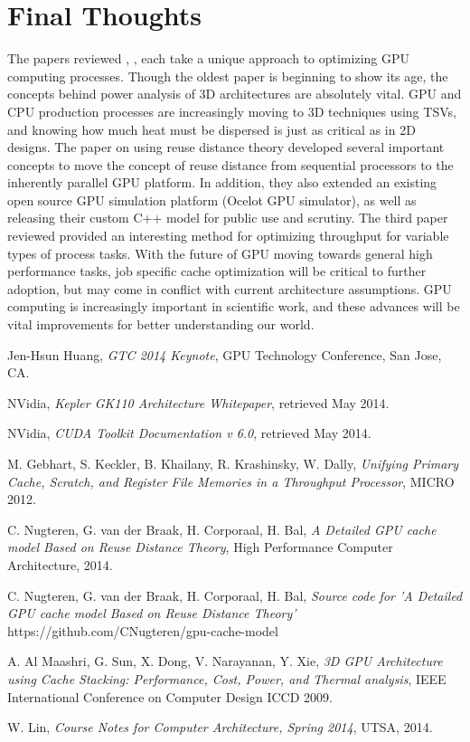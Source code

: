 \documentclass[conference]{IEEEtran}
\begin{document}
\section{Final Thoughts}
The papers reviewed \cite{throughput}, \cite{cache}, \cite{cachestacking} each
take a unique approach to optimizing GPU computing processes. Though the oldest
paper \cite{cachestacking} is beginning to show its age, the concepts behind 
power analysis of 3D architectures are absolutely vital. GPU and CPU production
processes are increasingly moving to 3D techniques using TSVs, and knowing how
much heat must be dispersed is just as critical as in 2D designs. The paper on
using reuse distance theory \cite{cache} developed several important concepts
to move the concept of reuse distance from sequential processors to the 
inherently parallel GPU platform. In addition, they also extended an existing 
open source GPU simulation platform (Ocelot GPU simulator), as well as 
releasing their custom C++ model for public use and scrutiny. The third paper 
reviewed \cite{throughput} provided an interesting method for optimizing 
throughput for variable types of process tasks. With the future of GPU 
moving towards general high performance tasks, job specific cache optimization 
will be critical to further adoption, but may come in conflict with current
architecture assumptions. GPU computing is increasingly important in scientific
work, and these advances will be vital improvements for better understanding
our world.

\begin{thebibliography}{1}
Jen-Hsun Huang, \emph{GTC 2014 Keynote}, GPU Technology Conference, San Jose, CA.

NVidia, \emph{Kepler GK110 Architecture Whitepaper}, retrieved May 2014.

NVidia, \emph{CUDA Toolkit Documentation v 6.0}, retrieved May 2014.

M. Gebhart, S. Keckler, B. Khailany, R. Krashinsky, W. Dally, 
\emph{Unifying Primary Cache, Scratch, and Register File Memories in a 
Throughput Processor}, MICRO 2012.

C. Nugteren, G. van der Braak, H. Corporaal, H. Bal, 
\emph{A Detailed GPU cache model Based on Reuse Distance Theory}, 
High Performance Computer Architecture, 2014.

C. Nugteren, G. van der Braak, H. Corporaal, H. Bal, 
\emph{Source code for 'A Detailed GPU cache model Based on Reuse Distance Theory'}
 https://github.com/CNugteren/gpu-cache-model

A. Al Maashri, G. Sun, X. Dong, V. Narayanan, Y. Xie,
\emph{3D GPU Architecture using Cache Stacking: Performance, Cost, Power, and
Thermal analysis}, IEEE International Conference on Computer Design ICCD 2009.

W. Lin, \emph{Course Notes for Computer Architecture, Spring 2014}, UTSA, 2014.
\end{thebibliography}

\end{document}
